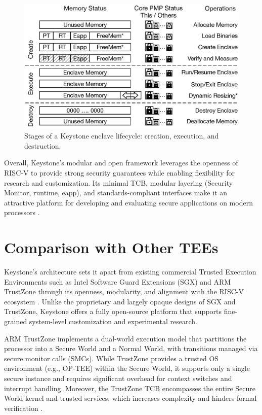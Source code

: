 \begin{figure}[htbp]
\centering
\includegraphics[width=0.9\linewidth]{figures/enclave_lifecycle.png}
\caption{Stages of a Keystone enclave lifecycle: creation, execution, and destruction.}
\label{fig:enclave_lifecycle}
\end{figure}

Overall, Keystone’s modular and open framework leverages the openness of RISC-V to provide strong security guarantees while enabling flexibility for research and customization. Its minimal TCB, modular layering (Security Monitor, runtime, eapp), and standards-compliant interfaces make it an attractive platform for developing and evaluating secure applications on modern processors \cite{dayeol2019keystone}.

\section{Comparison with Other TEEs}

Keystone’s architecture sets it apart from existing commercial Trusted Execution Environments such as Intel Software Guard Extensions (SGX) and ARM TrustZone through its openness, modularity, and alignment with the RISC-V ecosystem \cite{dayeol2019keystone}. Unlike the proprietary and largely opaque designs of SGX and TrustZone, Keystone offers a fully open-source platform that supports fine-grained system-level customization and experimental research.

ARM TrustZone implements a dual-world execution model that partitions the processor into a Secure World and a Normal World, with transitions managed via secure monitor calls (SMCs). While TrustZone provides a trusted OS environment (e.g., OP-TEE) within the Secure World, it supports only a single secure instance and requires significant overhead for context switches and interrupt handling. Moreover, the TrustZone TCB encompasses the entire Secure World kernel and trusted services, which increases complexity and hinders formal verification \cite{dayeol2019keystone}.

